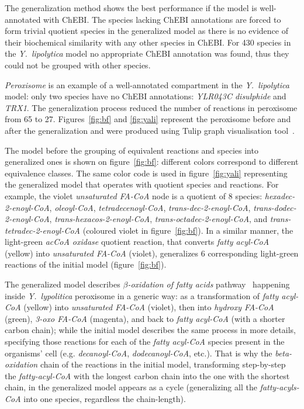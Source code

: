 \documentclass[9pt]{article}
\newcounter{fig}
\newcounter{rm}
\begin{document}
The generalization method shows the best performance if the model is well-annotated with ChEBI. The species lacking ChEBI annotations are forced to form trivial quotient species in the generalized model as there is no evidence of their biochemical similarity with any other species in ChEBI.  For 430 species in the \textit{Y.~lipolytica} model no appropriate ChEBI annotation was found, thus they could not be grouped with other species. 

\emph{Peroxisome} is an example of a well-annotated compartment in the \textit{Y.~lipolytica} model: only two species have no ChEBI annotations: \emph{YLR043C disulphide} and \emph{TRX1}. The generalization process reduced the number of reactions in peroxisome from 65 to 27. Figures~\ref{fig:bf} and \ref{fig:yali} represent the peroxisome before and after the generalization and were produced using Tulip graph visualisation tool~\citep{Auber04}.

The model before the grouping of equivalent reactions and species into generalized ones is shown on figure~\ref{fig:bf}: different colors correspond to different equivalence classes. The same color code is used in figure~\ref{fig:yali} representing the generalized model that operates with quotient species and reactions. For example, the violet \textit{unsaturated FA-CoA} node is a quotient of 8 species: \textit{hexadec-2-enoyl-CoA}, \textit{oleoyl-CoA}, \textit{tetradecenoyl-CoA}, \textit{trans-dec-2-enoyl-CoA}, \textit{trans-dodec-2-enoyl-CoA}, \textit{trans-hexacos-2-enoyl-CoA}, \textit{trans-octadec-2-enoyl-CoA}, and \textit{trans-tetradec-2-enoyl-CoA} (coloured violet in figure~\ref{fig:bf}). In a similar manner, the light-green \textit{acCoA oxidase} quotient reaction, that converts \textit{fatty acyl-CoA} (yellow) into \textit{unsaturated FA-CoA} (violet), generalizes 6 corresponding light-green reactions of the initial model (figure~\ref{fig:bf}).

The generalized model describes \textit{$\beta$-oxidation of fatty acids} pathway~\citep{Metzler01} happening inside \textit{Y.~lypolitica} peroxisome in a generic way: as a transformation of \textit{fatty acyl-CoA} (yellow) into \textit{unsaturated FA-CoA} (violet), then into \textit{hydroxy FA-CoA} (green), \textit{3-oxo FA-CoA} (magenta), and back to \textit{fatty acyl-CoA} (with a shorter carbon chain); while the initial model describes the same process in more details, specifying those reactions for each of the \textit{fatty acyl-CoA} species present in the organisms' cell (e.g. \textit{decanoyl-CoA}, \textit{dodecanoyl-CoA}, etc.). That is why the \textit{beta-oxidation} chain of the reactions in the initial model, transforming step-by-step the \emph{fatty-acyl-CoA} with the longest carbon chain into the one with the shortest chain, in the generalized model appears as a cycle (generalizing all the \textit{fatty-acyls-CoA} into one species, regardless the chain-length).
  
\end{document}
